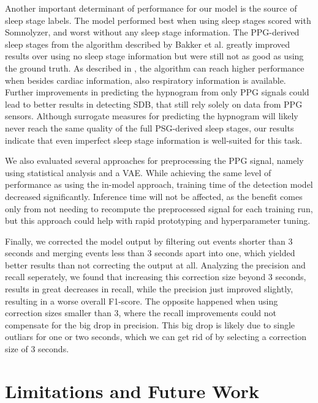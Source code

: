 Another important determinant of performance for our model is the source of sleep stage labels. The model performed best when using sleep stages scored with Somnolyzer, and worst without any sleep stage information. The PPG-derived sleep stages from the algorithm described by Bakker et al. \cite{bakker2021estimating} greatly improved results over using no sleep stage information but were still not as good as using the ground truth. As described in , the algorithm can reach higher performance when besides cardiac information, also respiratory information is available. Further improvements in predicting the hypnogram from only PPG signals could lead to better results in detecting SDB, that still rely solely on data from PPG sensors.
Although surrogate measures for predicting the hypnogram will likely never reach the same quality of the full PSG-derived sleep stages, our results indicate that even imperfect sleep stage information is well-suited for this task.

We also evaluated several approaches for preprocessing the PPG signal, namely using statistical analysis and a VAE. While achieving the same level of performance as using the in-model approach, training time of the detection model decreased significantly. Inference time will not be affected, as the benefit comes only from not needing to recompute the preprocessed signal for each training run, but this approach could help with rapid prototyping and hyperparameter tuning.

Finally, we corrected the model output by filtering out events shorter than 3 seconds and merging events less than 3 seconds apart into one, which yielded better results than not correcting the output at all.
Analyzing the precision and recall seperately, we found that increasing this correction size beyond 3 seconds, results in great decreases in recall, while the precision just improved slightly, resulting in a worse overall F1-score. The opposite happened when using correction sizes smaller than 3, where the recall improvements could not compensate for the big drop in precision. This big drop is likely due to single outliars for one or two seconds, which we can get rid of by selecting a correction size of 3 seconds.

\section{Limitations and Future Work}


